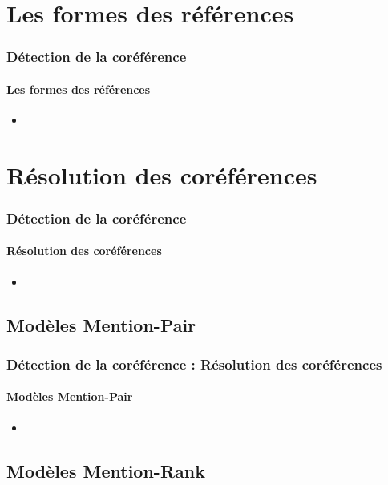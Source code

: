 \documentclass[xcolor=table]{beamer}
\begin{document}
\section{Les formes des références}

\begin{frame}
\frametitle{Détection de la coréférence}
\framesubtitle{Les formes des références}
	
	\begin{itemize}
		\item 
	\end{itemize}
	
\end{frame}

\section{Résolution des coréférences}

\begin{frame}
	\frametitle{Détection de la coréférence}
	\framesubtitle{Résolution des coréférences}
	
	\begin{itemize}
		\item 
	\end{itemize}
	
\end{frame}


\subsection{Modèles Mention-Pair}

\begin{frame}
	\frametitle{Détection de la coréférence : Résolution des coréférences}
	\framesubtitle{Modèles Mention-Pair}
	
	\begin{itemize}
		\item 
	\end{itemize}
	
\end{frame}

\subsection{Modèles Mention-Rank}
\end{document}
